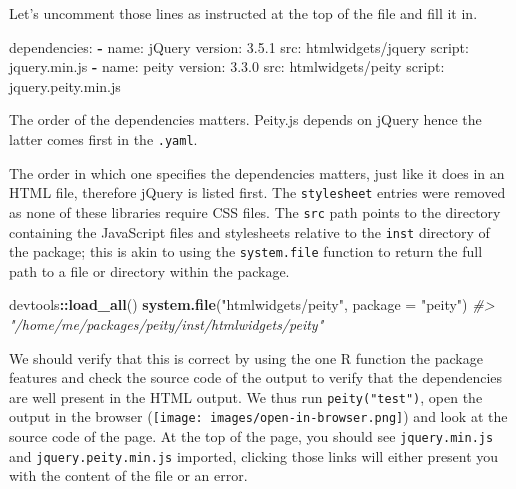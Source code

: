 \documentclass[10pt,]{krantz}
\makeatletter
\newenvironment{Shaded}{\begin{snugshade}}{\end{snugshade}}
\newcommand{\AttributeTok}[1]{\textcolor[rgb]{0.61,0.61,0.61}{#1}}
\newcommand{\CommentTok}[1]{\textcolor[rgb]{0.37,0.37,0.37}{\textit{#1}}}
\newcommand{\DataTypeTok}[1]{\textcolor[rgb]{0.27,0.27,0.27}{#1}}
\newcommand{\FloatTok}[1]{\textcolor[rgb]{0.06,0.06,0.06}{#1}}
\newcommand{\FunctionTok}[1]{\textcolor[rgb]{0,0,0}{#1}}
\newcommand{\KeywordTok}[1]{\textcolor[rgb]{0.27,0.27,0.27}{\textbf{#1}}}
\newcommand{\NormalTok}[1]{#1}
\newcommand{\OperatorTok}[1]{\textcolor[rgb]{0.43,0.43,0.43}{\textbf{#1}}}
\newcommand{\StringTok}[1]{\textcolor[rgb]{0.5,0.5,0.5}{#1}}
\newenvironment{kframe}{%
\medskip{}
\setlength{\fboxsep}{.8em}
 \def\at@end@of@kframe{}%
 \ifinner\ifhmode%
  \def\at@end@of@kframe{\end{minipage}}%
  \begin{minipage}{\columnwidth}%
 \fi\fi%
 \def\FrameCommand##1{\hskip\@totalleftmargin \hskip-\fboxsep
 \colorbox{shadecolor}{##1}\hskip-\fboxsep
     \hskip-\linewidth \hskip-\@totalleftmargin \hskip\columnwidth}%
 \MakeFramed {\advance\hsize-\width
   \@totalleftmargin\z@ \linewidth\hsize
   \@setminipage}}%
 {\par\unskip\endMakeFramed%
 \at@end@of@kframe}
\renewenvironment{Shaded}{\begin{kframe}}{\end{kframe}}
\newenvironment{rmdblock}[1]
  {
  \begin{itemize}
  \renewcommand{\labelitemi}{
    \raisebox{-.7\height}[0pt][0pt]{
      {\setkeys{Gin}{width=3em,keepaspectratio}\texttt{[image: images/\#1]}}
    }
  }
  \setlength{\fboxsep}{1em}
  \begin{kframe}
  \item
  }
  {
  \end{kframe}
  \end{itemize}
  }
\newenvironment{rmdnote}
  {\begin{rmdblock}{note}}
  {\end{rmdblock}}
\makeatother
\begin{document}
Let's uncomment those lines as instructed at the top of the file and fill it in.

\begin{Shaded}
\begin{Highlighting}[]
\FunctionTok{dependencies:}
  \KeywordTok{-} \FunctionTok{name:}\AttributeTok{ jQuery}
    \FunctionTok{version:}\AttributeTok{ }\FloatTok{3.5.1}
    \FunctionTok{src:}\AttributeTok{ htmlwidgets/jquery}
    \FunctionTok{script:}\AttributeTok{ jquery.min.js}
  \KeywordTok{-} \FunctionTok{name:}\AttributeTok{ peity}
    \FunctionTok{version:}\AttributeTok{ }\FloatTok{3.3.0}
    \FunctionTok{src:}\AttributeTok{ htmlwidgets/peity}
    \FunctionTok{script:}\AttributeTok{ jquery.peity.min.js}
\end{Highlighting}
\end{Shaded}

\begin{rmdnote}
The order of the dependencies matters. Peity.js depends on jQuery hence
the latter comes first in the \texttt{.yaml}.
\end{rmdnote}

The order in which one specifies the dependencies matters, just like it does in an HTML file, therefore jQuery is listed first. The \texttt{stylesheet} entries were removed as none of these libraries require CSS files. The \texttt{src} path points to the directory containing the JavaScript files and stylesheets relative to the \texttt{inst} directory of the package; this is akin to using the \texttt{system.file} function to return the full path to a file or directory within the package.

\begin{Shaded}
\begin{Highlighting}[]
\NormalTok{devtools}\OperatorTok{::}\KeywordTok{load_all}\NormalTok{()}
\KeywordTok{system.file}\NormalTok{(}\StringTok{"htmlwidgets/peity"}\NormalTok{, }\DataTypeTok{package =} \StringTok{"peity"}\NormalTok{)                                         }
\CommentTok{#> "/home/me/packages/peity/inst/htmlwidgets/peity"}
\end{Highlighting}
\end{Shaded}

We should verify that this is correct by using the one R function the package features and check the source code of the output to verify that the dependencies are well present in the HTML output. We thus run \texttt{peity("test")}, open the output in the browser (\texttt{[image: images/open-in-browser.png]}) and look at the source code of the page. At the top of the page, you should see \texttt{jquery.min.js} and \texttt{jquery.peity.min.js} imported, clicking those links will either present you with the content of the file or an error.
\end{document}
